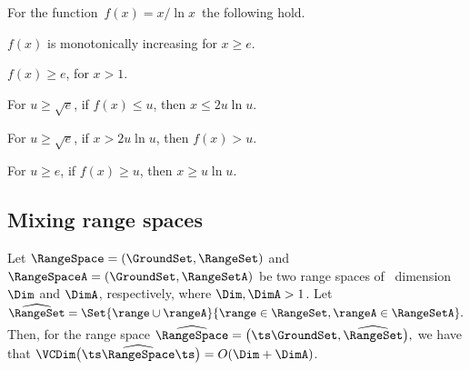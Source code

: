 \begin{lemma}
    For the function $\,f(x) = x / \ln x\,$ the following hold.
    \begin{compactenumA}
        \item $f(x)$ is monotonically increasing for $x \geq e$.
        \item $f(x) \geq e$, for $x >1$.
        \item For $u \geq \sqrt{e}$, if $f(x) \leq u$, then $x \leq 2
        u \ln u$.
        \item For $u \geq \sqrt{e}$, if $x > 2 u \ln u$, then $f(x) >
        u$.
        \label{nemesis:function:part:D}
        
        \item For $u \geq e$, if $f(x) \geq u$, then $x \geq u \ln u$.
    \end{compactenumA}
\end{lemma}


\subsection{Mixing range spaces}


\begin{lemma}
    Let $\RangeSpace = (\GroundSet,\RangeSet)$ and
    $\RangeSpaceA = (\GroundSet,\RangeSetA)$ be two range spaces of
    ~\VC dimension $\Dim$ and $\DimA$, respectively, where
    $\Dim, \DimA > 1$. Let
    \begin{math}
        \Bigl.  \widehat{\RangeSet}%
        =%
        \Set{\range \cup \rangeA}{ \range \in \RangeSet, \rangeA \in
           \RangeSetA}.
    \end{math}
      Then, for the range
    space
    \begin{math}
        \widehat{\RangeSpace} = \bigl( \ts \GroundSet,
        \widehat{\RangeSet} \bigr),
    \end{math}
     we have that
    $\VCDim\bigl( \ts \widehat{\RangeSpace} \ts \bigr)=O(\Dim +
    \DimA)$.
\end{lemma}

